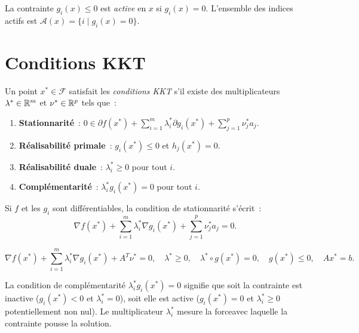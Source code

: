 \begin{definition}
La contrainte $g_i(x) \leq 0$ est \emph{active} en $x$ si $g_i(x) = 0$.
L'ensemble des indices actifs est $\mathcal{A}(x) = \{i \mid g_i(x) = 0\}$.
\end{definition}

\section{Conditions KKT}

\begin{definition}
Un point $x^* \in \mathcal{F}$ satisfait les \emph{conditions KKT} s'il existe des
multiplicateurs $\lambda^* \in \mathbb{R}^m$ et $\nu^* \in \mathbb{R}^p$ tels que~:
\begin{enumerate}
    \item \textbf{Stationnarit\'e}~:
    $\displaystyle 0 \in \partial f(x^*) + \sum_{i=1}^m \lambda_i^* \partial g_i(x^*)
    + \sum_{j=1}^p \nu_j^* a_j$.
    \item \textbf{R\'ealisabilit\'e primale}~: $g_i(x^*) \leq 0$ et $h_j(x^*) = 0$.
    \item \textbf{R\'ealisabilit\'e duale}~: $\lambda_i^* \geq 0$ pour tout $i$.
    \item \textbf{Compl\'ementarit\'e}~: $\lambda_i^* g_i(x^*) = 0$ pour tout $i$.
\end{enumerate}
\end{definition}

Si $f$ et les $g_i$ sont diff\'erentiables, la condition de stationnarit\'e s'\'ecrit~:
\[
    \nabla f(x^*) + \sum_{i=1}^m \lambda_i^* \nabla g_i(x^*) + \sum_{j=1}^p \nu_j^* a_j = 0.
\]

\begin{formules}[title=\textbf{Conditions KKT (cas diff\'erentiable)}]
\[
    \nabla f(x^*) + \sum_{i=1}^m \lambda_i^* \nabla g_i(x^*) + A^T\nu^* = 0, \quad
    \lambda^* \geq 0, \quad
    \lambda^* \circ g(x^*) = 0, \quad
    g(x^*) \leq 0, \quad
    Ax^* = b.
\]
\end{formules}

\begin{intuition}
La condition de compl\'ementarit\'e $\lambda_i^* g_i(x^*) = 0$ signifie que soit
la contrainte est inactive ($g_i(x^*) < 0$ et $\lambda_i^* = 0$), soit elle est
active ($g_i(x^*) = 0$ et $\lambda_i^* \geq 0$ potentiellement non nul).
Le multiplicateur $\lambda_i^*$ mesure la \og{}force\fg avec laquelle la contrainte
pousse la solution.
\end{intuition}

